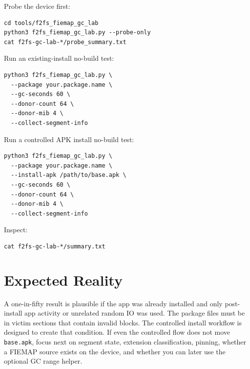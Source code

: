 \documentclass[11pt]{article}
\begin{document}
Probe the device first:

\begin{verbatim}
cd tools/f2fs_fiemap_gc_lab
python3 f2fs_fiemap_gc_lab.py --probe-only
cat f2fs-gc-lab-*/probe_summary.txt
\end{verbatim}

Run an existing-install no-build test:

\begin{verbatim}
python3 f2fs_fiemap_gc_lab.py \
  --package your.package.name \
  --gc-seconds 60 \
  --donor-count 64 \
  --donor-mib 4 \
  --collect-segment-info
\end{verbatim}

Run a controlled APK install no-build test:

\begin{verbatim}
python3 f2fs_fiemap_gc_lab.py \
  --package your.package.name \
  --install-apk /path/to/base.apk \
  --gc-seconds 60 \
  --donor-count 64 \
  --donor-mib 4 \
  --collect-segment-info
\end{verbatim}

Inspect:

\begin{verbatim}
cat f2fs-gc-lab-*/summary.txt
\end{verbatim}

\section{Expected Reality}

A one-in-fifty result is plausible if the app was already installed and only
post-install app activity or unrelated random IO was used.  The package files
must be in victim sections that contain invalid blocks.  The controlled install
workflow is designed to create that condition.  If even the controlled flow does
not move \texttt{base.apk}, focus next on segment state, extension
classification, pinning, whether a FIEMAP source exists on the device, and
whether you can later use the optional GC range helper.
\end{document}
